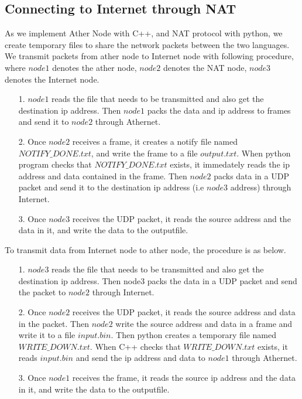 \documentclass[11pt, conference]{IEEEtran}
\begin{document}
\subsection{Connecting to Internet through NAT}

As we implement Ather Node with C++, and NAT protocol with python, we create temporary files to share the network packets
between the two languages. We transmit packets from ather node to Internet node with following procedure, where $node1$ denotes the ather node,
$node2$ denotes the NAT node, $node3$ denotes the Internet node.
\begin{enumerate}
    \item [1.] $node1$ reads the file that needs to be transmitted and also get the destination ip address. Then $node1$ packs the data and ip address to frames and send it to $node2$ through Athernet.
    \item [2.] Once $node2$ receives a frame, it creates a notify file named $NOTIFY\_DONE.txt$, and write the frame to a file $output.txt$. When python program checks that $NOTIFY\_DONE.txt$ exists,
                it immedately reads the ip address and data contained in the frame. Then $node2$ packs data in a UDP packet and send it to the destination ip address (i.e $node3$ address) through Internet.
    \item [3.] Once $node3$ receives the UDP packet, it reads the source address and the data in it, and write the data to the outputfile.            
\end{enumerate}
To transmit data from Internet node to ather node, the procedure is as below.
\begin{enumerate}
    \item [1.] $node3$ reads the file that needs to be transmitted and also get the destination ip address. Then node3 packs the data in a UDP packet and send the packet to $node2$
               through Internet.
    \item [2.] Once $node2$ receives the UDP packet, it reads the source address and data in the packet. Then $node2$ write the source address and data in a frame and write it to a file $input.bin$. Then python creates a temporary
    file named $WRITE\_DOWN.txt$. When C++ checks that $WRITE\_DOWN.txt$ exists, it reads $input.bin$ and send the ip address and data to $node1$ through Athernet.
    \item [3.] Once $node1$ receives the frame, it reads the source ip address and the data in it, and write the data to the outputfile.
\end{enumerate}
\end{document}
